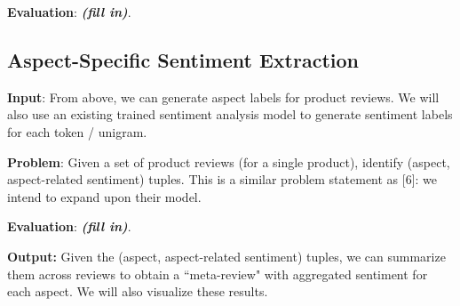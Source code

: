 \documentclass{article} %
\begin{document}
\textbf{Evaluation}: {\it \bf (fill in)}.

\subsection{Aspect-Specific Sentiment Extraction}

\textbf{Input}: From above, we can generate aspect labels for product reviews. We will also use an existing trained sentiment analysis model to generate sentiment labels for each token / unigram.

\textbf{Problem}: Given a set of product reviews (for a single product), identify (aspect, aspect-related sentiment) tuples. This is a similar problem statement as [6]: we intend to expand upon their model.

\textbf{Evaluation}: {\it \bf (fill in)}.

\textbf{Output:} Given the (aspect, aspect-related sentiment) tuples, we can summarize them across reviews to obtain a ``meta-review" with aggregated sentiment for each aspect. We will also visualize these results.





\end{document}
